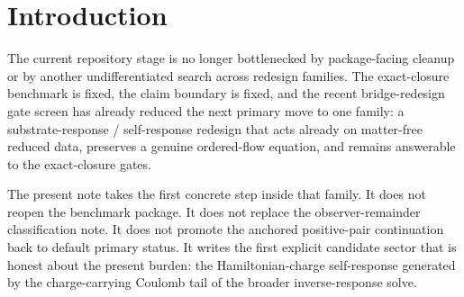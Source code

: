 \documentclass[11pt]{article}
\newcommand{\CandidateMetric}{g^{\mathrm{cand}}}
\newcommand{\SourceDensityRed}{\varrho_\Omega^{\mathrm{red}}}
\begin{document}
\begin{abstract}
Second, the candidate still leaves one operative metric with universal matter coupling, because matter and light couple only through \(\CandidateMetric\). Third, the note linearizes the added response block about an admissible homogeneous branch. The new fields are slice-wise elliptic or algebraic, vanish at linear order because \(\SourceDensityRed=\mathcal O_{\ge 2}\), and therefore introduce no unsuppressed linear scalar, vector, ghost, or preferred-frame remainder. Relative to any already-admissible GR-compatible base branch, the ordinary two-tensor infrared content is preserved.

This note does not yet prove the controlled GR-limit theorem or the final residual-sector verdict. Its positive result is narrower and exactly the one now needed: one explicit substrate-response / self-response candidate sector has been written inside the surviving family, its eliminated observer equation is derived first on matter-free reduced data, its one-metric matter route is explicit, and its first infrared screen is carried out honestly.
\end{abstract}

\section{Introduction}

The current repository stage is no longer bottlenecked by package-facing cleanup or by another undifferentiated search across redesign families. The exact-closure benchmark is fixed, the claim boundary is fixed, and the recent bridge-redesign gate screen has already reduced the next primary move to one family: a substrate-response / self-response redesign that acts already on matter-free reduced data, preserves a genuine ordered-flow equation, and remains answerable to the exact-closure gates.

The present note takes the first concrete step inside that family. It does not reopen the benchmark package. It does not replace the observer-remainder classification note. It does not promote the anchored positive-pair continuation back to default primary status. It writes the first explicit candidate sector that is honest about the present burden: the Hamiltonian-charge self-response generated by the charge-carrying Coulomb tail of the broader inverse-response solve.
\end{document}
